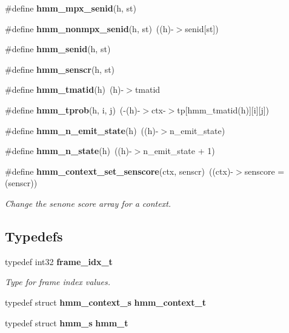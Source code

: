 \begin{DoxyCompactItemize}
\item 
\#define {\bfseries hmm\+\_\+mpx\+\_\+senid}(h,  st)
\item 
\mbox{\label{hmm_8h_a45850600910ae0839f34792b00b5970b}} 
\#define {\bfseries hmm\+\_\+nonmpx\+\_\+senid}(h,  st)~((h)-\/$>$senid[st])
\item 
\#define {\bfseries hmm\+\_\+senid}(h,  st)
\item 
\#define {\bfseries hmm\+\_\+senscr}(h,  st)
\item 
\mbox{\label{hmm_8h_a749193daefb4247e56dbc6b3f2d75c14}} 
\#define {\bfseries hmm\+\_\+tmatid}(h)~(h)-\/$>$tmatid
\item 
\mbox{\label{hmm_8h_a3d6e71af2d2ce897e63a5ee8c5741593}} 
\#define {\bfseries hmm\+\_\+tprob}(h,  i,  j)~(-\/(h)-\/$>$ctx-\/$>$tp[hmm\+\_\+tmatid(h)][i][j])
\item 
\mbox{\label{hmm_8h_a4ef324f17daafd4de126b88671c7e93c}} 
\#define {\bfseries hmm\+\_\+n\+\_\+emit\+\_\+state}(h)~((h)-\/$>$n\+\_\+emit\+\_\+state)
\item 
\mbox{\label{hmm_8h_a16311c1d64310ad3a8af33eec0fbe9f1}} 
\#define {\bfseries hmm\+\_\+n\+\_\+state}(h)~((h)-\/$>$n\+\_\+emit\+\_\+state + 1)
\item 
\mbox{\label{hmm_8h_a44d0b5515cb269bf9b95f62aada18cbb}} 
\#define \textbf{ hmm\+\_\+context\+\_\+set\+\_\+senscore}(ctx,  senscr)~((ctx)-\/$>$senscore = (senscr))
\begin{DoxyCompactList}\small\item\em Change the senone score array for a context. \end{DoxyCompactList}\end{DoxyCompactItemize}
\subsection*{Typedefs}
\begin{DoxyCompactItemize}
\item 
typedef int32 \textbf{ frame\+\_\+idx\+\_\+t}
\begin{DoxyCompactList}\small\item\em Type for frame index values. \end{DoxyCompactList}\item 
\mbox{\label{hmm_8h_a87dd8e0478af63326664232541d2ade6}} 
typedef struct \textbf{ hmm\+\_\+context\+\_\+s} {\bfseries hmm\+\_\+context\+\_\+t}
\item 
\mbox{\label{hmm_8h_a6f69b65f5fd63aa882fbe6002be74c13}} 
typedef struct \textbf{ hmm\+\_\+s} {\bfseries hmm\+\_\+t}
\end{DoxyCompactItemize}
